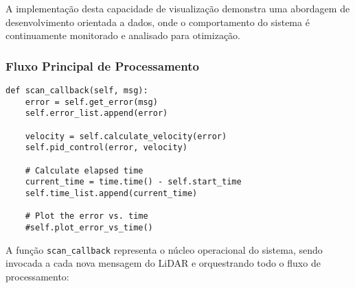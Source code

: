 A implementação desta capacidade de visualização demonstra uma abordagem de
desenvolvimento orientada a dados, onde o comportamento do sistema é
continuamente monitorado e analisado para otimização.

\subsubsection{Fluxo Principal de Processamento}

\begin{verbatim}
def scan_callback(self, msg):
    error = self.get_error(msg)
    self.error_list.append(error)

    velocity = self.calculate_velocity(error)
    self.pid_control(error, velocity)

    # Calculate elapsed time
    current_time = time.time() - self.start_time
    self.time_list.append(current_time)

    # Plot the error vs. time
    #self.plot_error_vs_time()
\end{verbatim}

A função \texttt{scan\_callback} representa o núcleo operacional do sistema,
sendo invocada a cada nova mensagem do LiDAR e orquestrando todo o fluxo de
processamento:

